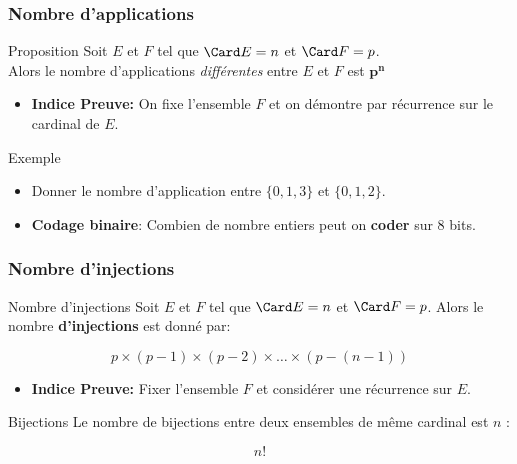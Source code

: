 \begin{frame}[t]
  \frametitle{Nombre d'applications}
 \begin{block}{Proposition}
   Soit $E$ et $F$ tel que $\Card E = n$ et $\Card F=p$.\\[8pt]

   Alors le nombre d'applications \emph{différentes} entre $E$ et $F$ est
   $\mathbf{p^n}$
 \end{block} 
 \begin{itemize}
   \item \textbf{\alert{Indice Preuve:}} On fixe l'ensemble $F$ et on démontre
     par récurrence sur le cardinal de $E$.
 \end{itemize}
 \begin{block}{Exemple}
   \begin{itemize}
     \item Donner le nombre d'application entre $\{0,1,3\}$ et $\{0,1,2\}$.
     \item \textbf{Codage binaire}: Combien de nombre entiers peut on
       \textbf{\alert{coder}} sur $8$ bits. 
   \end{itemize}
 \end{block}
\end{frame}

\begin{frame}[<+->]
  \frametitle{Nombre d'injections}
 
  \begin{block}{Nombre d'injections}
   Soit $E$ et $F$ tel que $\Card E= n$ et $\Card F=p$. Alors le nombre
   \textbf{d'injections} est donné par:

   \begin{equation*}
     p\times (p-1) \times (p-2)\times \ldots \times\left(p-(n-1)\right)
   \end{equation*}
  \end{block}

  \begin{itemize}
    \item \alert{\textbf{Indice Preuve:}} Fixer l'ensemble $F$ et considérer une
      récurrence sur $E$.
  \end{itemize}
  \pause
  \begin{block}{Bijections}
   Le nombre de bijections entre deux ensembles de même cardinal est $n$ :

   \begin{equation*}
     n!
   \end{equation*}
  \end{block}
\end{frame}

